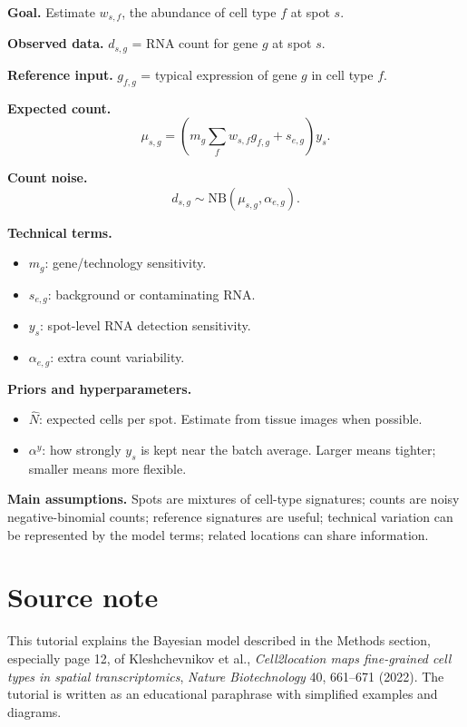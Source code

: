 \documentclass[11pt]{article}
\newcommand{\NB}{\mathrm{NB}}
\begin{document}
\begin{tcolorbox}[colback=softblue,colframe=deepblue,title=Cell2location page-12 model cheat sheet,fonttitle=\bfseries,breakable]
\textbf{Goal.} Estimate $w_{s,f}$, the abundance of cell type $f$ at spot $s$.

\textbf{Observed data.} $d_{s,g}$ = RNA count for gene $g$ at spot $s$.

\textbf{Reference input.} $g_{f,g}$ = typical expression of gene $g$ in cell type $f$.

\textbf{Expected count.}
\[
\mu_{s,g}=\left(m_g\sum_f w_{s,f}g_{f,g}+s_{e,g}\right)y_s.
\]

\textbf{Count noise.}
\[
d_{s,g}\sim \NB(\mu_{s,g},\alpha_{e,g}).
\]

\textbf{Technical terms.}
\begin{itemize}
  \item $m_g$: gene/technology sensitivity.
  \item $s_{e,g}$: background or contaminating RNA.
  \item $y_s$: spot-level RNA detection sensitivity.
  \item $\alpha_{e,g}$: extra count variability.
\end{itemize}

\textbf{Priors and hyperparameters.}
\begin{itemize}
  \item $\hat N$: expected cells per spot. Estimate from tissue images when possible.
  \item $\alpha^y$: how strongly $y_s$ is kept near the batch average. Larger means tighter; smaller means more flexible.
\end{itemize}

\textbf{Main assumptions.}
Spots are mixtures of cell-type signatures; counts are noisy negative-binomial counts; reference signatures are useful; technical variation can be represented by the model terms; related locations can share information.
\end{tcolorbox}

\section*{Source note}
This tutorial explains the Bayesian model described in the Methods section, especially page 12, of Kleshchevnikov et al., \emph{Cell2location maps fine-grained cell types in spatial transcriptomics}, \emph{Nature Biotechnology} 40, 661--671 (2022). The tutorial is written as an educational paraphrase with simplified examples and diagrams.
\end{document}

